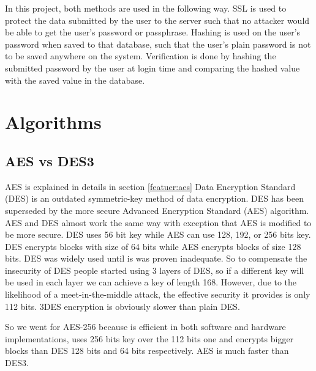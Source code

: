 In this project, both methods are used in the following way. SSL is used to protect the data submitted by the user to the server such that no attacker would be able to get the user's password or passphrase. Hashing is used on the user's password when saved to that database, such that the user's plain password is not to be saved anywhere on the system. Verification is done by hashing the submitted password by the user at login time and comparing the hashed value with the saved value in the database.

\section{Algorithms}

\subsection{AES vs DES3}
AES is explained in details in section \ref{featuer:aes}
Data Encryption Standard (DES) is an outdated symmetric-key method of data encryption. DES has been superseded by the more secure Advanced Encryption Standard (AES) algorithm. AES and DES almost work the same way with exception that AES is modified to be more secure. DES uses 56 bit key while AES can use 128, 192, or 256 bits key. DES encrypts blocks with size of 64 bits while AES encrypts blocks of size 128 bits. DES was widely used until is was proven inadequate. So to compensate the insecurity of DES people started using 3 layers of DES, so if a different key will be used in each layer we can achieve a key of length 168. However, due to the likelihood of a meet-in-the-middle attack, the effective security it provides is only 112 bits. 3DES encryption is obviously slower than plain DES.
\par So we went for AES-256 because is efficient in both software and hardware implementations, uses 256 bits key over the 112 bits one and encrypts bigger blocks than DES 128 bits and 64 bits respectively. AES is much faster than DES3.

